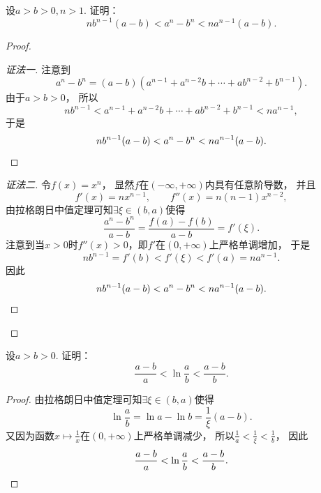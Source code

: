 \begin{example}
设\(a>b>0,n>1\).
证明：\begin{equation*}
	n b^{n-1} (a-b) < a^n-b^n < n a^{n-1} (a-b).
\end{equation*}
\begin{proof}
\begin{proof}[证法一]
注意到\begin{equation*}
	a^n-b^n
	= (a-b)(a^{n-1} + a^{n-2} b + \dotsb + a b^{n-2} + b^{n-1}).
\end{equation*}
由于\(a>b>0\)，
所以\begin{equation*}
	n b^{n-1} < a^{n-1} + a^{n-2} b + \dotsb + a b^{n-2} + b^{n-1} < n a^{n-1},
\end{equation*}
于是\begin{equation*}
	n b^{n-1} (a-b) < a^n-b^n < n a^{n-1} (a-b).
	\qedhere
\end{equation*}
\end{proof}
\begin{proof}[证法二]
令\(f(x) = x^n\)，
显然\(f\)在\((-\infty,+\infty)\)内具有任意阶导数，
并且\begin{equation*}
	f'(x) = n x^{n-1},
	\qquad
	f''(x) = n(n-1) x^{n-2},
\end{equation*}
由拉格朗日中值定理可知\(\exists\xi\in(b,a)\)使得\begin{equation*}
	\frac{a^n-b^n}{a-b}
	= \frac{f(a)-f(b)}{a-b}
	= f'(\xi).
\end{equation*}
注意到当\(x>0\)时\(f''(x)>0\)，即\(f'\)在\((0,+\infty)\)上严格单调增加，
于是\begin{equation*}
	n b^{n-1} = f'(b) < f'(\xi) < f'(a) = n a^{n-1}.
\end{equation*}
因此\begin{equation*}
	n b^{n-1} (a-b) < a^n-b^n < n a^{n-1} (a-b).
	\qedhere
\end{equation*}
\end{proof}\let\qed\relax
\end{proof}
\end{example}
\begin{example}
设\(a>b>0\).
证明：\begin{equation*}
	\frac{a-b}{a} < \ln\frac{a}{b} < \frac{a-b}{b}.
\end{equation*}
\begin{proof}
由拉格朗日中值定理可知\(\exists\xi\in(b,a)\)使得\begin{equation*}
	\ln\frac{a}{b}
	= \ln a - \ln b
	= \frac1\xi (a-b).
\end{equation*}
又因为函数\(x \mapsto \frac1x\)在\((0,+\infty)\)上严格单调减少，
所以\(\frac1a < \frac1\xi < \frac1b\)，
因此\begin{equation*}
	\frac{a-b}{a} < \ln\frac{a}{b} < \frac{a-b}{b}.
	\qedhere
\end{equation*}
\end{proof}
\end{example}
